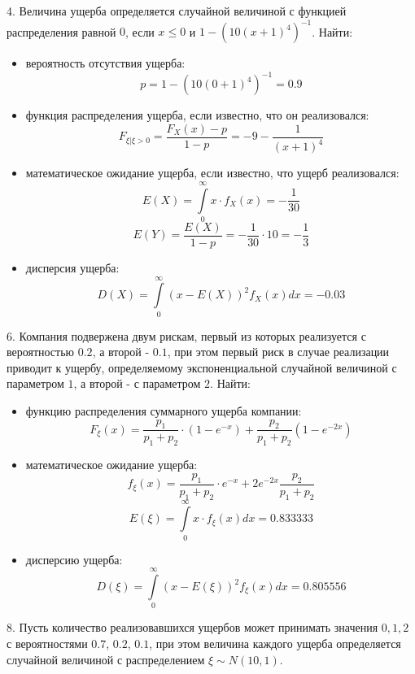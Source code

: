 \documentclass[%
12pt, %
final, %
oneside, %
onecolumn, %
centertags]{article} %
\theoremstyle{plain}
\theoremstyle{definition}
\theoremstyle{remark}
\begin{document}
4. Величина ущерба определяется случайной величиной с функцией распределения равной $0$, если $x \leqslant 0$ и $1 - (10(x+1)^4)^{-1}$. Найти:

\begin{itemize}
	\item вероятность отсутствия ущерба:
	$$p = 1 - (10(0+1)^4)^{-1} = 0.9 $$
	\item функция распределения ущерба, если известно, что он реализовался:
	$$F_{\xi \vert \xi >0} = \frac{F_{X}(x) - p}{1-p} = - 9  - \frac{1}{(x+1)^4}$$
	\item математическое ожидание ущерба, если известно, что ущерб реализовался:
	$$E(X) = \int\limits_0^{\infty} x \cdot f_{X}(x) = -\frac{1}{30}$$
	$$E(Y) = \frac{E(X)}{1-p} = -\frac{1}{30} \cdot 10 = -\frac{1}{3}$$
	\item дисперсия ущерба:
	$$D(X) = \int\limits_0^{\infty} (x - E(X))^2 f_{X}(x) dx = -0.03$$
\end{itemize}

6. Компания подвержена двум рискам, первый из которых реализуется с вероятностью $0.2$, а второй - $0.1$, при этом первый риск в случае реализации приводит к ущербу, определяемому экспоненциальной случайной величиной с параметром $1$, а второй  - с параметром $2$. Найти:

\begin{itemize}
	\item функцию распределения суммарного ущерба компании:
	$$F_{\xi}(x) = \frac{p_1}{p_1+p_2} \cdot (1  - e^{-x}) + \frac{p_2}{p_1 + p_2}(1 - e^{-2x})$$
	\item математическое ожидание ущерба:
	$$f_{\xi}(x) =\frac{p_1}{p_1+p_2}  \cdot e^{-x} + 2e^{-2x}\frac{p_2}{p_1+p_2} $$
	$$E(\xi) =  \int\limits_{0}^{\infty} x \cdot f_{\xi}(x) dx = 0.833333$$
	\item дисперсию ущерба:
	$$D(\xi) = \int\limits_0^{\infty} (x - E(\xi))^2 f_{\xi}(x) dx  = 0.805556$$
\end{itemize}

8. Пусть количество реализовавшихся ущербов может принимать значения $0, 1, 2$ с вероятностями $0.7$, $0.2$, $0.1$, при этом величина каждого ущерба определяется случайной величиной с распределением $\xi \sim N(10,1)$.
\end{document}
